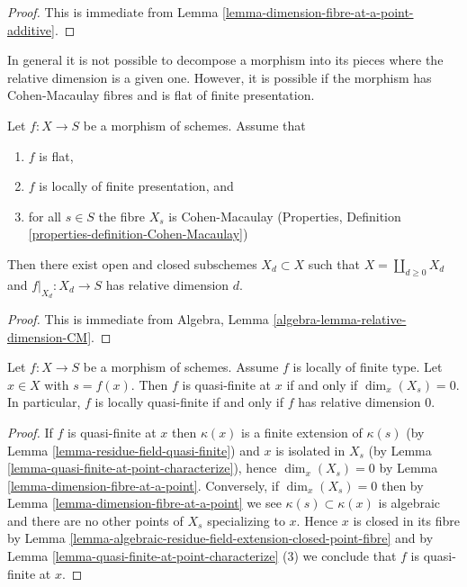 \begin{proof}
This is immediate from Lemma \ref{lemma-dimension-fibre-at-a-point-additive}.
\end{proof}

\noindent
In general it is not possible to decompose a morphism
into its pieces where the relative dimension is a given
one. However, it is possible if the morphism has Cohen-Macaulay
fibres and is flat of finite presentation.

\begin{lemma}
\label{lemma-flat-finite-presentation-CM-fibres-relative-dimension}
Let $f : X \to S$ be a morphism of schemes.
Assume that
\begin{enumerate}
\item $f$ is flat,
\item $f$ is locally of finite presentation, and
\item for all $s \in S$ the fibre $X_s$ is Cohen-Macaulay
(Properties, Definition \ref{properties-definition-Cohen-Macaulay})
\end{enumerate}
Then there exist open and closed subschemes $X_d \subset X$
such that $X = \coprod_{d \geq 0} X_d$ and $f|_{X_d} : X_d \to S$
has relative dimension $d$.
\end{lemma}

\begin{proof}
This is immediate from
Algebra, Lemma
\ref{algebra-lemma-relative-dimension-CM}.
\end{proof}

\begin{lemma}
\label{lemma-locally-quasi-finite-rel-dimension-0}
Let $f : X \to S$ be a morphism of schemes.
Assume $f$ is locally of finite type.
Let $x \in X$ with $s = f(x)$.
Then $f$ is quasi-finite at $x$ if and only if $\dim_x(X_s) = 0$.
In particular, $f$ is locally quasi-finite if and only if $f$ has relative
dimension $0$.
\end{lemma}

\begin{proof}
If $f$ is quasi-finite at $x$ then $\kappa(x)$ is a finite extension of
$\kappa(s)$ (by
Lemma \ref{lemma-residue-field-quasi-finite})
and $x$ is isolated in $X_s$ (by
Lemma \ref{lemma-quasi-finite-at-point-characterize}),
hence $\dim_x(X_s) = 0$ by
Lemma \ref{lemma-dimension-fibre-at-a-point}.
Conversely, if $\dim_x(X_s) = 0$ then by
Lemma \ref{lemma-dimension-fibre-at-a-point}
we see $\kappa(s) \subset \kappa(x)$ is algebraic and
there are no other points of $X_s$ specializing to $x$.
Hence $x$ is closed in its fibre by
Lemma \ref{lemma-algebraic-residue-field-extension-closed-point-fibre}
and by
Lemma \ref{lemma-quasi-finite-at-point-characterize} (3)
we conclude that $f$ is quasi-finite at $x$.
\end{proof}

